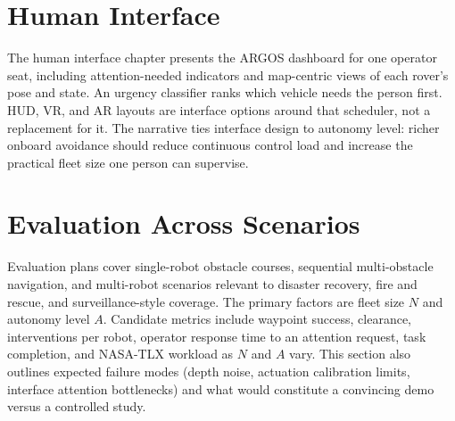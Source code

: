 \documentclass[11pt,a4paper]{article}
\begin{document}
\section{Human Interface}
\label{sec:hmi}
The human interface chapter presents the ARGOS dashboard for one operator seat, including attention-needed indicators and map-centric views of each rover's pose and state.
An urgency classifier ranks which vehicle needs the person first. HUD, VR, and AR layouts are interface options around that scheduler, not a replacement for it.
The narrative ties interface design to autonomy level: richer onboard avoidance should reduce continuous control load and increase the practical fleet size one person can supervise.

\section{Evaluation Across Scenarios}
\label{sec:evaluation}
Evaluation plans cover single-robot obstacle courses, sequential multi-obstacle navigation, and multi-robot scenarios relevant to disaster recovery, fire and rescue, and surveillance-style coverage.
The primary factors are fleet size \(N\) and autonomy level \(A\).
Candidate metrics include waypoint success, clearance, interventions per robot, operator response time to an attention request, task completion, and NASA-TLX workload as \(N\) and \(A\) vary.
This section also outlines expected failure modes (depth noise, actuation calibration limits, interface attention bottlenecks) and what would constitute a convincing demo versus a controlled study.
\end{document}
